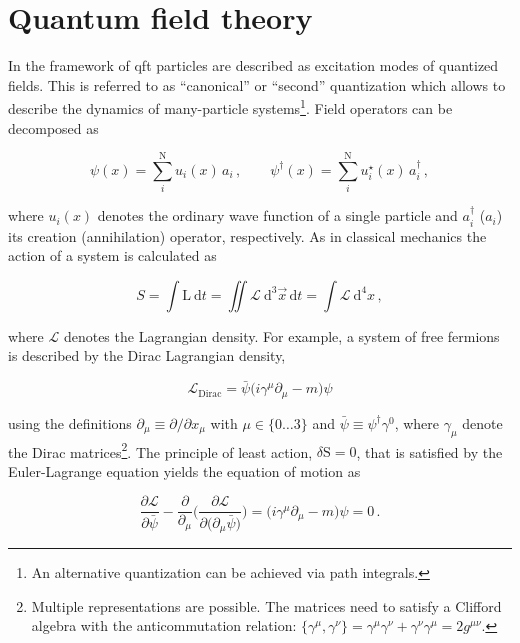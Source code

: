 \section{Quantum field theory}

In the framework of \gls{qft} particles are described as excitation modes of quantized fields. This is referred to as ``canonical'' or ``second'' quantization which allows to describe the dynamics of many-particle systems\footnote{An alternative quantization can be achieved via path integrals.}. Field operators can be decomposed as

\begin{equation}
\psi(x)=\sum_{i}^{\mathrm{N}}u_{i}(x)\,a_{i}\,,\qquad\psi^{\dagger}(x)=\sum_{i}^{\mathrm{N}}u^{\star}_{i}(x)\,a^{\dagger}_{i}\,,
\end{equation}

where $u_{i}(x)$ denotes the ordinary wave function of a single particle and $a^{\dagger}_{i}$ ($a_{i}$) its creation (annihilation) operator, respectively. As in classical mechanics the action of a system is calculated as

\begin{equation}
S=\int\mathrm{L}~\mathrm{d}t=\iint\mathcal{L}~\mathrm{d}^{3}\vec{x}\,\mathrm{d}t=\int\mathcal{L}~\mathrm{d}^{4}x\,,
\end{equation}

where $\mathcal{L}$ denotes the Lagrangian density. For example, a system of free fermions is described by the Dirac Lagrangian density,

\begin{equation}
\label{eq:theory-diracL}
\mathcal{L}_\mathrm{Dirac}=\bar{\psi}\big(i\gamma^\mu\partial_\mu-m\big)\psi
\end{equation}

using the definitions $\partial_\mu\equiv\partial/\partial x_\mu$ with $\mu\in\{0\ldots3\}$ and $\bar{\psi}\equiv\psi^\dagger\gamma^{0}$, where $\gamma_\mu$ denote the Dirac matrices\footnote{Multiple representations are possible. The matrices need to satisfy a Clifford algebra with the anticommutation relation: $\big\{\gamma^\mu,\gamma^\nu\big\}=\gamma^\mu\gamma^\nu+\gamma^\nu\gamma^\mu=2g^{\mu\nu}$.}. The principle of least action, $\delta \mathrm{S}=0$, that is satisfied by the Euler-Lagrange equation yields the equation of motion as

\begin{equation}
\frac{\partial\mathcal{L}}{\partial\bar{\psi}}-\frac{\partial}{\partial_\mu}\Bigg(\frac{\partial\mathcal{L}}{\partial\big(\partial_\mu\bar{\psi}\big)}\Bigg)=\big(i\gamma^\mu\partial_\mu-m\big)\psi=0\,.
\end{equation}

